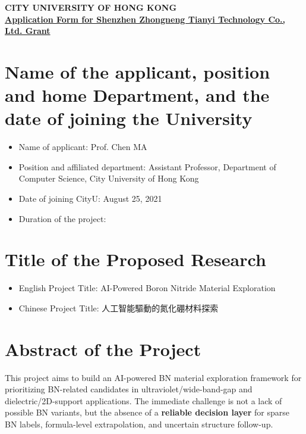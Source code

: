 \documentclass[12pt,a4paper]{article}
\newcommand{\blank}[1][7em]{\colorbox{yellow!35}{\rule{0pt}{1.05em}\hspace{#1}}}
\begin{document}
\vspace{-60pt}
\begin{center}
    \textbf{CITY UNIVERSITY OF HONG KONG}\\
    \vspace{10pt}
    {\small\underline{\textbf{Application Form for Shenzhen Zhongneng Tianyi Technology Co., Ltd. Grant}}}\\
\end{center}

\section{Name of the applicant, position and home Department, and the date of joining the University}
\begin{itemize}[leftmargin=15pt]
    \vspace{-8pt}
    \item Name of applicant: Prof. Chen MA
    \vspace{-8pt}
    \item Position and affiliated department: Assistant Professor, Department of Computer Science, City University of Hong Kong
    \vspace{-8pt}
    \item Date of joining CityU: August 25, 2021
    \vspace{-8pt}
    \item Duration of the project: \blank[12em]
\end{itemize}

\vspace{-20pt}
\section{Title of the Proposed Research}
\begin{itemize}[leftmargin=15pt]
    \vspace{-8pt}
    \item English Project Title: AI-Powered Boron Nitride Material Exploration
    \vspace{-8pt}
    \item Chinese Project Title: {\zhTitleFont 人工智能驅動的氮化硼材料探索}
\end{itemize}

\vspace{-20pt}
\section{Abstract of the Project}
\vspace{-10pt}
This project aims to build an AI-powered BN material exploration framework for prioritizing BN-related candidates in ultraviolet/wide-band-gap and dielectric/2D-support applications. The immediate challenge is not a lack of possible BN variants, but the absence of a \textbf{reliable decision layer} for sparse BN labels, formula-level extrapolation, and uncertain structure follow-up.
\end{document}
